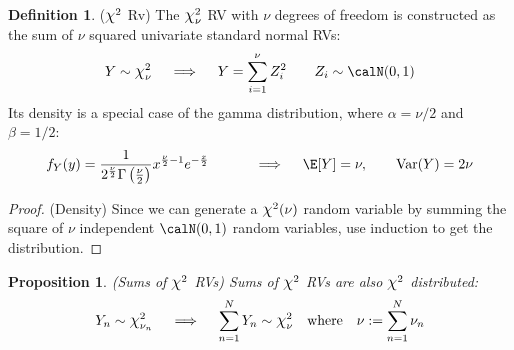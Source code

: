 \documentclass[12pt]{article}
\theoremstyle{plain}
\newtheorem{prop}[thm]{Proposition}
\theoremstyle{definition}
\newtheorem{defn}[thm]{Definition}
\theoremstyle{remark}
\newcommand*{\Chi}{\mbox{\large$\chi$}} %
\newcommand{\Var}{\operatorname{Var}}
\newcommand{\sumnN}{\sum^N_{n=1}}
\begin{document}
\begin{defn}($\Chi^2$ Rv)
The $\Chi^2_\nu$ RV with $\nu$ degrees of freedom is constructed as the
sum of $\nu$ squared univariate standard normal RVs:
\begin{align*}
  Y \sim \Chi^2_\nu
  \quad\implies\quad
	 Y = \sum^\nu_{i=1} Z^2_i
   \qquad Z_i \sim \calN(0,1)
\end{align*}
Its density is a special case of the gamma distribution, where
$\alpha = \nu/2$ and $\beta = 1/2$:
\begin{equation}
   f_Y(y) =
   \frac{1}{2^{\frac{\nu}{2}} \Gamma\left(\frac{\nu}{2}\right)}
    x^{\frac{\nu}{2} - 1} e^{-\frac{x}{2}} \qquad
   \quad\implies\quad
   \E[Y] = \nu, \qquad \Var(Y) = 2\nu
\end{equation}
\end{defn}
\begin{proof}(Density)
Since we can generate a $\Chi^2(\nu)$ random variable by summing the
square of $\nu$ independent $\calN(0,1)$ random variables, use induction
to get the distribution.
\end{proof}

\begin{prop}\emph{(Sums of $\Chi^2$ RVs)}
\label{prop:chisum}
Sums of $\Chi^2$ RVs are also $\Chi^2$ distributed:
\begin{align*}
  Y_n\sim\Chi_{\nu_n}^2
  \quad\implies\quad
  \sumnN Y_n \sim \Chi^2_{\nu}
  \quad
  \text{where}\quad
  \nu:=\sumnN \nu_n
\end{align*}
\end{prop}
\end{document}
